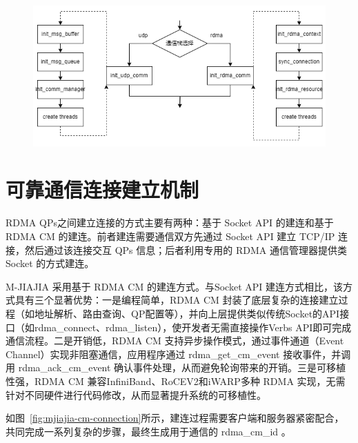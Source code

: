 {\begin{figure}[!htbp]
    \centering
    \includegraphics[width=\textwidth]{Img/RDMA-comm-modules.png}
    \label{fig:mjiajia-rdma-modules}
\end{figure}

\section{可靠通信连接建立机制}
RDMA QPs之间建立连接的方式主要有两种：基于 Socket API 的建连和基于 RDMA CM 的建连。前者建连需要通信双方先通过 Socket API 建立 TCP/IP 连接，然后通过该连接交互 QPs 信息；后者利用专用的 RDMA 通信管理器提供类 Socket 的方式建连。

M-JIAJIA 采用基于 RDMA CM 的建连方式。与Socket API 建连方式相比，该方式具有三个显著优势：一是编程简单，RDMA CM 封装了底层复杂的连接建立过程（如地址解析、路由查询、QP配置等），并向上层提供类似传统Socket的API接口（如rdma\_connect、rdma\_listen），使开发者无需直接操作Verbs API即可完成通信流程。二是开销低，RDMA CM 支持异步操作模式，通过事件通道（Event Channel）实现非阻塞通信，应用程序通过 rdma\_get\_cm\_event 接收事件，并调用 rdma\_ack\_cm\_event 确认事件处理，从而避免轮询带来的开销。三是可移植性强，RDMA CM 兼容InfiniBand、RoCEV2和iWARP多种 RDMA 实现，无需针对不同硬件进行代码修改，从而显著提升系统的可移植性。

如图~\ref{fig:mjiajia-cm-connection}所示，建连过程需要客户端和服务器紧密配合，共同完成一系列复杂的步骤，最终生成用于通信的 rdma\_cm\_id 。

}
